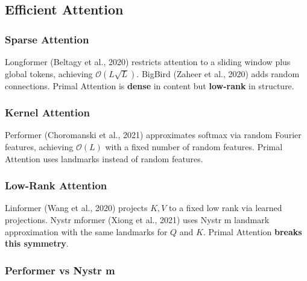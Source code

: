 \subsection{Efficient Attention}

\subsubsection{Sparse Attention}

Longformer (Beltagy et al., 2020) restricts attention to a sliding window 
plus global tokens, achieving $\mathcal{O}(L \sqrt{L})$. BigBird (Zaheer et 
al., 2020) adds random connections. Primal Attention is \textbf{dense} in content 
but \textbf{low-rank} in structure.

\subsubsection{Kernel Attention}

Performer (Choromanski et al., 2021) approximates softmax via random Fourier 
features, achieving $\mathcal{O}(L)$ with a fixed number of random features. 
Primal Attention uses landmarks instead of random features.

\subsubsection{Low-Rank Attention}

Linformer (Wang et al., 2020) projects $K, V$ to a fixed low rank via learned 
projections. Nystr mformer (Xiong et al., 2021) uses Nystr m landmark 
approximation with the same landmarks for $Q$ and $K$. Primal Attention 
\textbf{breaks this symmetry}.

\subsubsection{Performer vs Nystr m}

